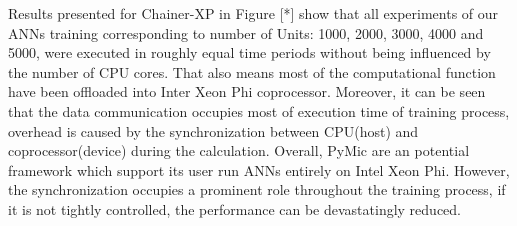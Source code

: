 Results presented for Chainer-XP in Figure [*] show that all experiments of our ANNs training corresponding to number of Units: 1000, 2000, 3000, 4000 and 5000, were executed in roughly equal time periods without being influenced by the number of CPU cores. That also means most of the computational function have been offloaded into Inter Xeon Phi coprocessor. Moreover, it can be seen that the data communication occupies most of execution time of training process, overhead is caused by the synchronization between CPU(host) and coprocessor(device) during the calculation. Overall, PyMic are an potential framework which support its user run ANNs entirely on Intel Xeon Phi. However, the synchronization occupies a prominent role throughout the training process, if it is not tightly controlled, the performance can be devastatingly reduced.


